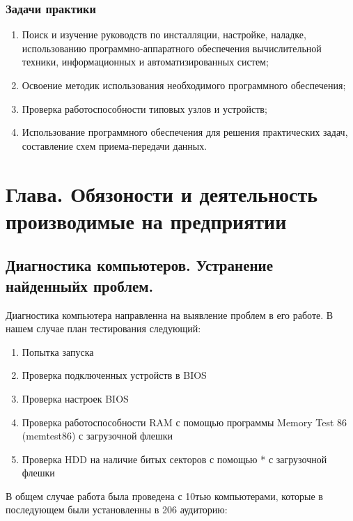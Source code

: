 \documentclass[14pt, oneside]{altsu-report}
\begin{document}
\subsection*{Задачи практики}
\begin{enumerate}
  \item  Поиск и изучение руководств по инсталляции, настройке, наладке, использованию программно-аппаратного обеспечения вычислительной техники, информационных и автоматизированных систем;
  \item  Освоение методик использования необходимого программного обеспечения;
  \item  Проверка работоспособности типовых узлов и устройств;
  \item  Использование программного обеспечения для решения практических задач, составление схем приема-передачи данных.
\end{enumerate}



\chapter{Глава. Обязоности и деятельность производимые на предприятии}
\section{Диагностика компьютеров. Устранение найденныйх проблем.}
Диагностика компьютера направленна на выявление проблем в его работе. В нашем случае план тестирования следующий:
\begin{enumerate}
  \item Попытка запуска
  \item Проверка подключенных устройств в BIOS
  \item Проверка настроек BIOS
  \item Проверка работоспособности RAM с помощью программы Memory Test 86 (memtest86) с загрузочной флешки
  \item Проверка HDD на наличие битых секторов с помощью * с загрузочной флешки
\end{enumerate}

В общем случае работа была проведена с 10тью компьютерами, которые в последующем были установленны в 206 аудиторию:
\end{document}

